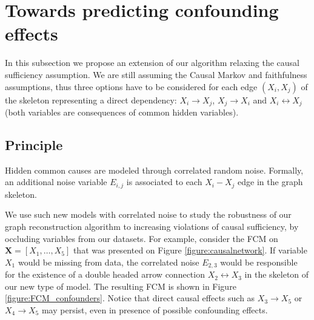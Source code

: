 \documentclass[a4paper, 11pt]{article}
\begin{document}
\section{Towards predicting confounding effects
\label{confounder}}

In this subsection we propose an extension of our algorithm relaxing the causal sufficiency assumption. We are still assuming the Causal Markov and faithfulness assumptions, thus three options  have to be considered for each edge $(X_i,X_j)$ of the skeleton representing a direct dependency: $X_i \rightarrow X_j$, $X_j \rightarrow X_i$ and $X_i\leftrightarrow X_j$ (both variables are consequences of common hidden variables).

\subsection{Principle}

Hidden common causes are modeled through correlated random noise. Formally, an additional noise variable $E_{i,j}$ is associated to each $X_i-X_j$ edge in the graph skeleton.

We use such new models with correlated noise to study the robustness of our graph reconstruction algorithm to increasing violations of causal sufficiency, by occluding variables from our datasets. For example, consider the FCM on $\mathbf{X} = [X_1, \ldots, X_5]$ that was presented on Figure \ref{figure:causalnetwork}. If variable $X_1$ would be missing from data, the correlated noise $E_{2,3}$ would be responsible for the existence of a double headed arrow connection  $X_2\leftrightarrow X_3$ in the skeleton of our new type of model. The resulting FCM is shown in Figure  \ref{figure:FCM_confounders}. Notice that direct causal effects such as $X_3 \rightarrow X_5$ or $X_4 \rightarrow X_5$ may persist, even in presence of possible confounding effects.
\end{document}

